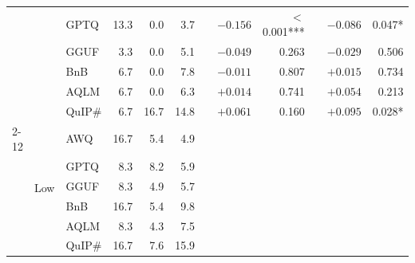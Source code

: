 \begin{table}[t]
\begin{tabular}{ll l rrr c rr c rr}
         &  & GPTQ & 13.3 & 0.0 & 3.7 & & $-0.156$ & $<$0.001*** & & $-0.086$ & 0.047* \\
         &  & GGUF & 3.3 & 0.0 & 5.1 & & $-0.049$ & 0.263 & & $-0.029$ & 0.506 \\
         &  & BnB & 6.7 & 0.0 & 7.8 & & $-0.011$ & 0.807 & & $+0.015$ & 0.734 \\
         &  & AQLM & 6.7 & 0.0 & 6.3 & & $+0.014$ & 0.741 & & $+0.054$ & 0.213 \\
         &  & QuIP# & 6.7 & 16.7 & 14.8 & & $+0.061$ & 0.160 & & $+0.095$ & 0.028* \\
        \cmidrule(l){2-12}
         & \multirow{6}{*}{Low} & AWQ & 16.7 & 5.4 & 4.9 & &  &  & &  &  \\
         &  & GPTQ & 8.3 & 8.2 & 5.9 & &  &  & &  &  \\
         &  & GGUF & 8.3 & 4.9 & 5.7 & &  &  & &  &  \\
         &  & BnB & 16.7 & 5.4 & 9.8 & &  &  & &  &  \\
         &  & AQLM & 8.3 & 4.3 & 7.5 & &  &  & &  &  \\
         &  & QuIP# & 16.7 & 7.6 & 15.9 & &  &  & &  &  \\
        \bottomrule
    \end{tabular}
    \vspace{-0.2cm}
\end{table}
